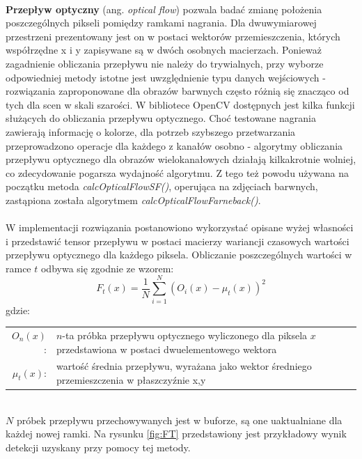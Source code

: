 \paragraph{}
\textbf{Przepływ optyczny} (ang. \textit{optical flow}) pozwala badać zmianę położenia poszczególnych pikseli pomiędzy ramkami nagrania. Dla dwuwymiarowej przestrzeni prezentowany jest on w postaci wektorów przemieszczenia, których współrzędne x i y zapisywane są w dwóch osobnych macierzach. Ponieważ zagadnienie obliczania przepływu nie należy do trywialnych, przy wyborze odpowiedniej metody istotne jest uwzględnienie typu danych wejściowych - rozwiązania zaproponowane dla obrazów barwnych często różnią się znacząco od tych dla scen w skali szarości. W bibliotece OpenCV dostępnych jest kilka funkcji służących do obliczania przepływu optycznego. Choć testowane nagrania zawierają informację o kolorze, dla potrzeb szybszego przetwarzania przeprowadzono operacje dla każdego z kanałów osobno - algorytmy obliczania przepływu optycznego dla obrazów wielokanałowych działają kilkakrotnie wolniej, co zdecydowanie pogarsza wydajność algorytmu. Z tego też powodu używana na początku metoda \textit{calcOpticalFlowSF()}, operująca na zdjęciach barwnych, zastąpiona została algorytmem \textit{calcOpticalFlowFarneback()}. 
\paragraph{}
W implementacji rozwiązania postanowiono wykorzystać opisane wyżej własności i przedstawić tensor przepływu w postaci macierzy wariancji czasowych wartości przepływu optycznego dla każdego piksela. Obliczanie poszczególnych wartości w ramce $t$ odbywa się zgodnie ze wzorem:
\begin{equation}
F_{t}(x) = \frac{1}{N}\sum_{i=1}^{N} (O_{i}(x)-\mu_{t}(x))^2
\end{equation}
gdzie:\\ 
\hspace*{3em}
\begin{tabular}{r l}
$O_{n}(x)$: &  $n$-ta próbka przepływu optycznego wyliczonego dla piksela $x$ przedstawiona w postaci dwuelementowego wektora\\
$\mu_{t}(x)$: & wartość średnia przepływu, wyrażana jako wektor średniego przemieszczenia w płaszczyźnie x,y 
\end{tabular} \\

$N$ próbek przepływu przechowywanych jest w buforze, są one uaktualniane dla każdej nowej ramki. Na rysunku \ref{fig:FT} przedstawiony jest przykładowy wynik detekcji uzyskany przy pomocy tej metody.

